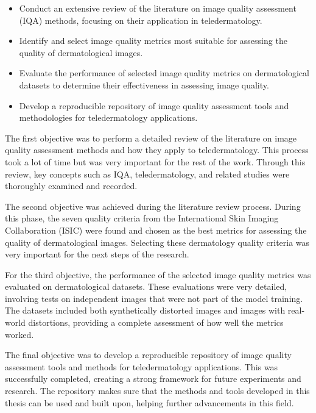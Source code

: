 \begin{itemize}
    \item Conduct an extensive review of the literature on image quality assessment (IQA) methods, focusing on their application in teledermatology.
    \item Identify and select image quality metrics most suitable for assessing the quality of dermatological images.
    \item Evaluate the performance of selected image quality metrics on dermatological datasets to determine their effectiveness in assessing image quality.
    \item Develop a reproducible repository of image quality assessment tools and methodologies for teledermatology applications.
\end{itemize}
\noindent
The first objective was to perform a detailed review of the literature on image quality assessment methods and how they apply to teledermatology. This process took a lot of time but was very important for the rest of the work. Through this review, key concepts such as IQA, teledermatology,  and related studies were thoroughly examined and recorded. \par
\vspace{\baselineskip}
\noindent
The second objective was achieved during the literature review process. During this phase, the seven quality criteria from the International Skin Imaging Collaboration (ISIC) were found and chosen as the best metrics for assessing the quality of dermatological images. Selecting these dermatology quality criteria was very important for the next steps of the research. \par
\vspace{\baselineskip}
\noindent
For the third objective, the performance of the selected image quality metrics was evaluated on dermatological datasets. These evaluations were very detailed, involving tests on independent images that were not part of the model training. The datasets included both synthetically distorted images and images with real-world distortions, providing a complete assessment of how well the metrics worked. \par
\vspace{\baselineskip}
\noindent
The final objective was to develop a reproducible repository of image quality assessment tools and methods for teledermatology applications. This was successfully completed, creating a strong framework for future experiments and research. The repository makes sure that the methods and tools developed in this thesis can be used and built upon, helping further advancements in this field. \par

